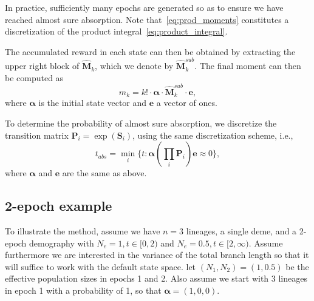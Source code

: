 \documentclass[hidelinks,11pt]{article}
\begin{document}
    In practice, sufficiently many epochs are generated so as to ensure we have reached almost sure absorption.
    Note that~\eqref{eq:prod_moments} constitutes a discretization of the product integral~\eqref{eq:product_integral}.

    The accumulated reward in each state can then be obtained by extracting the upper right block of $\hat{\mathbf{M}}_k$, which we denote by $\hat{\mathbf{M}}_k^{sub}$.
    The final moment can then be computed as
    \begin{equation*}
        m_k = k! \cdot \bm{\alpha} \cdot \hat{\mathbf{M}}_k^{sub} \cdot \mathbf{e},
    \end{equation*}
    where $\bm{\alpha}$ is the initial state vector and $\mathbf{e}$ a vector of ones.

    To determine the probability of almost sure absorption, we discretize the transition matrix $\mathbf{P}_i = \exp(\mathbf{S}_i)$, using the same discretization scheme, i.e.,
    \begin{equation*}
        t_{abs} = \min_i\{t: \bm{\alpha} (\prod_i \mathbf{P}_i) \mathbf{e} \approx 0 \},
    \end{equation*}
    where $\bm{\alpha}$ and $\mathbf{e}$ are the same as above.

    \subsection{2-epoch example}\label{subsec:2-epoch-example}
    To illustrate the method, assume we have $n=3$ lineages, a single deme, and a 2-epoch demography with $N_e = 1, t \in [0, 2)$ and $N_e = 0.5, t \in [2, \infty)$.
    Assume furthermore we are interested in the variance of the total branch length so that it will suffice to work with the default state space.
    let $(N_1, N_2) = (1, 0.5)$ be the effective population sizes in epochs 1 and 2.
    Also assume we start with 3 lineages in epoch 1 with a probability of 1, so that $\bm{\alpha} = (1, 0, 0)$.
\end{document}
